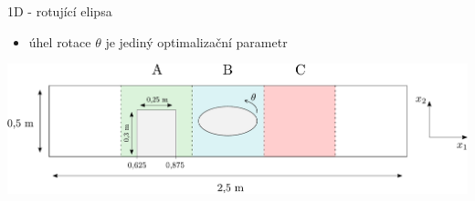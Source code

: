 \documentclass[aspectratio=169,xcolor=dvipsnames]{beamer}
\begin{document}
\begin{frame}{1D - rotující elipsa}
	\begin{itemize}
		\item úhel rotace $ \theta $ je jediný optimalizační parametr
		\vspace{7mm}
	\end{itemize}
	\includegraphics[width=1\linewidth, trim={0 0 0 0}, clip]{Images/elipsa2.pdf}			
\end{frame}
\end{document}
